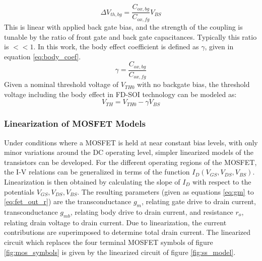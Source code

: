 	\begin{equation}
		\Delta V_{th,bg}= \frac{C_{ox,bg}}{C_{ox,fg}}V_{BS} 
	\end{equation}	
	This is linear with applied back gate bias, and the strength of the coupling is tunable by the ratio of front gate and back gate capacitances. Typically this ratio is $<<1$. In this work, the body effect coefficient is defined as $\gamma$, given in equation \ref{eq:body_coef}.
	\begin{equation}\label{eq:body_coef}
		\gamma = \frac{C_{ox,bg}}{C_{ox,fg}}
	\end{equation}
	Given a nominal threshold voltage of $V_{TH0}$ with no backgate bias, the threshold voltage including the body effect in FD-SOI technology can be modeled as:
	\begin{equation}\label{eq:body_effect}
		V_{TH} = V_{TH0} - \gamma V_{BS}
	\end{equation}

	\subsubsection{Linearization of MOSFET Models}
	Under conditions where a MOSFET is held at near constant bias levels, with only minor variations around the DC operating level, simpler linearized models of the transistors can be developed. For the different operating regions of the MOSFET, the I-V relations can be generalized in terms of the function $I_D(V_{GS}, V_{DS}, V_{BS})$. Linearization is then obtained by calculating the slope of $I_D$ with respect to the potentials $V_{GS}, V_{DS}, V_{BS}$. The resulting parameters (given as equations \ref{eq:gm} to \ref{eq:fet_out_r}) are the transconductance $g_m$, relating gate drive to drain current, transconductance $g_{mb}$, relating body drive to drain current, and resistance $r_o$, relating drain voltage to drain current. Due to linearization, the current contributions are superimposed to determine total drain current. The linearized circuit which replaces the four terminal MOSFET symbols of figure \ref{fig:mos_symbols} is given by the linearized circuit of figure \ref{fig:ss_model}.

